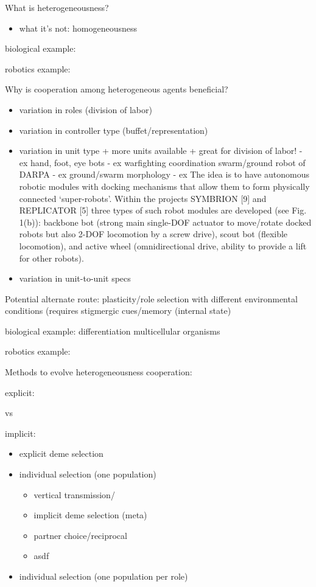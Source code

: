 What is heterogeneousness?
\begin{itemize}
\item what it's not: homogeneousness
\end{itemize}

biological example:

robotics example:


Why is cooperation among heterogeneous agents beneficial?
\begin{itemize}
\item variation in roles (division of labor)
\item variation in controller type (buffet/representation)
\item variation in unit type
+ more units available
+ great for division of labor!
  - ex hand, foot, eye bots \cite{dorigo2013novel}
  - ex warfighting coordination swarm/ground robot of DARPA
  - ex ground/swarm morphology \cite{mathews2012supervised}
  - ex The idea is to have autonomous robotic modules with docking mechanisms that allow them to form physically connected ‘super-robots’. Within the projects SYMBRION [9] and REPLICATOR [5] three types of such robot modules are developed (see Fig. 1(b)): backbone bot (strong main single-DOF actuator to move/rotate docked robots but also 2-DOF locomotion by a screw drive), scout bot (flexible locomotion), and active wheel (omnidirectional drive, ability to provide a lift for other robots).\cite{hamann2012towards}
\item variation in unit-to-unit specs \cite{pugh2007parallel} \cite{duarte2016evolution}
\end{itemize}

Potential alternate route: plasticity/role selection with different environmental conditions (requires stigmergic cues/memory (internal state)

biological example: differentiation multicellular organisms

robotics example:

Methods to evolve heterogeneousness cooperation:

explicit:

vs

implicit:

\begin{itemize}
\item explicit deme selection
\item individual selection (one population)
\begin{itemize}
  \item vertical transmission/
  \item implicit deme selection (meta)
  \item partner choice/reciprocal
\end{itemize}
\begin{itemize}
  \item asdf
\end{itemize}
\item individual selection (one population per role) \cite{luke1996evolving}
\end{itemize}

